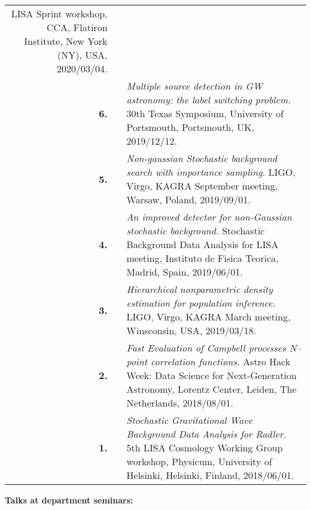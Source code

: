 {\begin{longtable}{rp{0.3cm}p{15.8cm}}
LISA Sprint workshop, CCA, Flatiron Institute, New York (NY), USA, 2020/03/04.
\vspace{0.05cm}\\
%
\textbf{6.} &  & \textit{Multiple source detection in GW astronomy: the label switching problem.}
\newline{}
30th Texas Symposium, University of Portsmouth, Portsmouth, UK, 2019/12/12.
\vspace{0.05cm}\\
%
\textbf{5.} &  & \textit{Non-gaussian Stochastic background search with importance sampling.}
\newline{}
LIGO, Virgo, KAGRA September meeting, Warsaw, Poland, 2019/09/01.
\vspace{0.05cm}\\
%
\textbf{4.} &  & \textit{An improved detector for non-Gaussian stochastic background.}
\newline{}
Stochastic Background Data Analysis for LISA meeting, Instituto de Fisica Teorica, Madrid, Spain, 2019/06/01.
\vspace{0.05cm}\\
%
\textbf{3.} &  & \textit{Hierarchical nonparametric density estimation for population inference.}
\newline{}
LIGO, Virgo, KAGRA March meeting, Winsconsin, USA, 2019/03/18.
\vspace{0.05cm}\\
%
\textbf{2.} &  & \textit{Fast Evaluation of Campbell processes N–point correlation functions.}
\newline{}
Astro Hack Week: Data Science for Next-Generation Astronomy, Lorentz Center, Leiden, The Netherlands, 2018/08/01.
\vspace{0.05cm}\\
%
\textbf{1.} &  & \textit{Stochastic Gravitational Wave Background Data Analysis for Radler.}
\newline{}
5th LISA Cosmology Working Group workshop, Physicum, University of Helsinki, Helsinki, Finland, 2018/06/01.
\vspace{0.05cm}\\
%
\end{longtable} }
\textcolor{color1}{\textbf{Talks at department seminars:}}
\vspace{-0.5cm}

